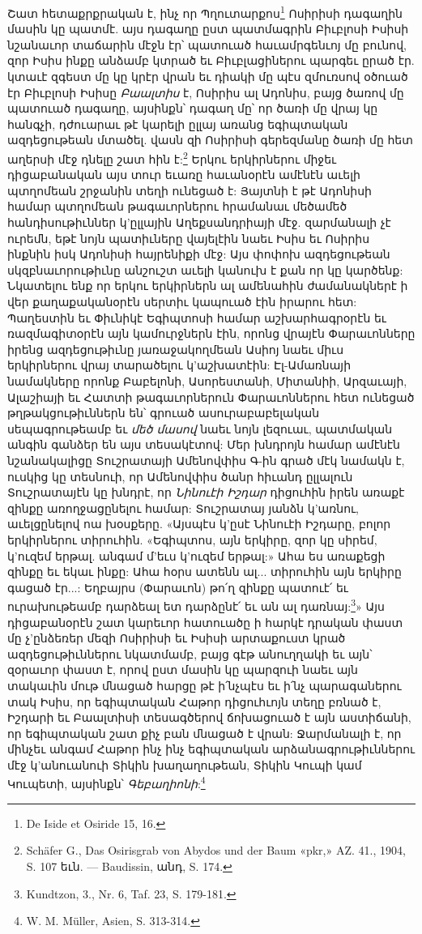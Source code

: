 \documentclass{article}
\begin{document}
{Շատ հետաքրքրական է, ինչ որ Պղուտարքոս\footnote{De Iside et Osiride 15, 16.} Ոսիրիսի դագաղին մասին կը պատմէ. այս դագաղը ըստ պատմագրին Բիւբլոսի Իսիսի նշանաւոր տաճարին մէջն էր՝ պատուած հաւամրգենւոյ մը բունով, զոր Իսիս ինքը անձամբ կտրած եւ Բիւբլացիներու պարգեւ ըրած էր. կտաւէ զգեստ մը կը կրէր վրան եւ դիակի մը պէս զմուռսով օծուած էր Բիւբլոսի Իսիսը \emph{Բաալտիս} է, Ոսիրիս ալ Ադոնիս, բայց ծառով մը պատուած դագաղը, այսինքն՝ դագաղ մը՝ որ ծառի մը վրայ կը հանգչի, դժուարաւ թէ կարելի ըլլայ առանց եգիպտական ազդեցութեան մտածել. վասն զի Ոսիրիսի գերեզմանը ծառի մը հետ աղերսի մէջ դնելը շատ հին է:\footnote{Schäfer G., Das Osirisgrab von Abydos und der Baum «pkr,» AZ. 41., 1904, S. 107 եւն. — Baudissin, անդ, S. 174.} Երկու երկիրներու միջեւ դիցաբանական այս տուր եւառը հաւանօրէն ամէնէն աւելի պտղոմեան շրջանին տեղի ունեցած է: Յայտնի է թէ Ադոնիսի համար պտղոմեան թագաւորներու հրամանաւ մեծամեծ հանդիսութիւններ կ'ըլլային Աղեքսանդրիայի մէջ. զարմանալի չէ ուրեմն, եթէ նոյն պատիւները վայելէին նաեւ Իսիս եւ Ոսիրիս ինքնին իսկ Ադոնիսի հայրենիքի մէջ: Այս փոփոխ ազդեցութեան սկզբնաւորութիւնը անշուշտ աւելի կանուխ է քան որ կը կարծենք: Նկատելու ենք որ երկու երկիրներն ալ ամենահին ժամանակներէ ի վեր քաղաքականօրէն սերտիւ կապուած էին իրարու հետ: Պաղեստին եւ Փիւնիկէ Եգիպտոսի համար աշխարհագրօրէն եւ ռազմագիտօրէն այն կամուրջներն էին, որոնց վրայէն Փարաւոնները իրենց ազդեցութիւնը յառաջակողմեան Ասիոյ նաեւ միւս երկիրներու վրայ տարածելու կ'աշխատէին: Էլ-Ամառնայի նամակները որոնք Բաբելոնի, Ասորեստանի, Միտանիի, Արզաւայի, Ալաշիայի եւ Հատտի թագաւորներուն Փարաւոններու հետ ունեցած թղթակցութիւններն են՝ գրուած ասուրաբաբելական սեպագրութեամբ եւ \emph{մեծ մասով} նաեւ նոյն լեզուաւ, պատմական անգին գանձեր են այս տեսակէտով: Մեր խնդրոյն համար ամէնէն նշանակալիցը Տուշրատայի Ամենովփիս Գ-ին գրած մէկ նամակն է, ուսկից կը տեսնուի, որ Ամենովփիս ծանր հիւանդ ըլլալուն Տուշրատայէն կը խնդրէ, որ \emph{Նինուէի Իշդար} դիցուհին իրեն առաքէ զինքը առողջացընելու համար: Տուշրատայ յանձն կ'առնու, աւելցընելով ոա խօսքերը. «Այսպէս կ'ըսէ Նինուէի Իշդարը, բոլոր երկիրներու տիրուհին. «Եգիպտոս, այն երկիրը, զոր կը սիրեմ, կ'ուզեմ երթալ. անգամ մ'եւս կ'ուզեմ երթալ:» Ահա ես առաքեցի զինքը եւ եկաւ ինքը: Ահա հօրս ատենն ալ... տիրուհին այն երկիրը գացած էր...: Եղբայրս (Փարաւոն) թո՛ղ զինքը պատուէ՛ եւ ուրախութեամբ դարձեալ ետ դարձընէ՛ եւ ան ալ դառնայ:\footnote{Kundtzon, 3., Nr. 6, Taf. 23, S. 179-181.}» Այս դիցաբանօրէն շատ կարեւոր հատուածը ի հարկէ դրական փաստ մը չ'ընձեռեր մեզի Ոսիրիսի եւ Իսիսի արտաքուստ կրած ազդեցութիւններու նկատմամբ, բայց գէթ անուղղակի եւ այն՝ զօրաւոր փաստ է, որով ըստ մասին կը պարզուի նաեւ այն տակաւին մութ մնացած հարցը թէ ի՛նչպէս եւ ի՛նչ պարագաներու տակ Իսիս, որ եգիպտական Հաթոր դիցուհւոյն տեղը բռնած է, Իշդարի եւ Բաալտիսի տեսագծերով ճոխացուած է այն աստիճանի, որ եգիպտական շատ քիչ բան մնացած է վրան: Ջարմանալի է, որ մինչեւ անգամ Հաթոր ինչ ինչ եգիպտական արձանագրութիւններու մէջ կ'անուանուի Տիկին խաղաղութեան, Տիկին Կուպի կամ Կուպետի, այսինքն՝ \emph{Գեբաղիոնի}:\footnote{W. M. Müller, Asien, S. 313-314.}

}
\end{document}
